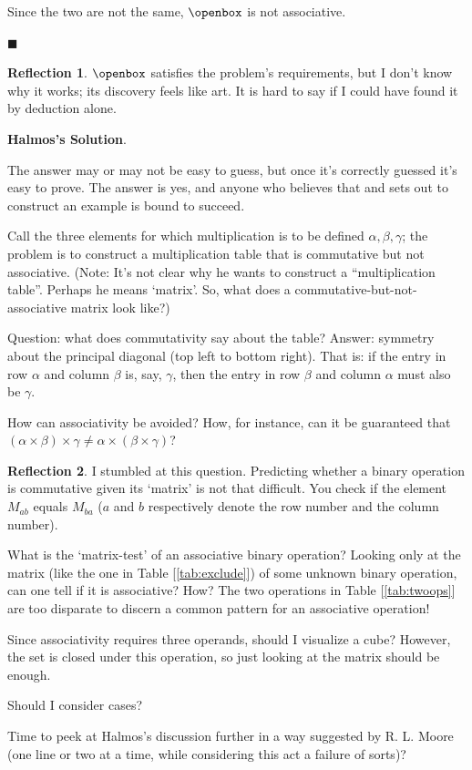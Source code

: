\documentclass[english,notitlepage,smartquotes]{hgbreport}
\theoremstyle{definition}
\theoremstyle{definition}
\theoremstyle{remark}
\theoremstyle{definition}
\theoremstyle{plain}
\renewcommand\qedsymbol{$\blacksquare$}
\theoremstyle{definition}
\newtheorem{reflection}{Reflection}
\begin{document}
Since the two are not the same, $\openbox$ is not associative.

\qedsymbol

\begin{reflection}
$\openbox$ satisfies the problem's requirements, but I don't know why it works; its discovery feels like art. It is hard to say if I could have found it by deduction alone. 
\end{reflection}
\textbf{Halmos's Solution}.

The answer may or may not be easy to guess, but once it's correctly guessed it's easy to prove. The answer is yes, and anyone who believes that and sets out to construct an example is bound to succeed.

Call the three elements for which multiplication is to be defined $\alpha,\beta,\gamma$; the problem is to construct a multiplication table that is commutative but not associative. (Note: It's not clear why he wants to construct a ``multiplication table''. Perhaps he means `matrix'. So, what does a commutative-but-not-associative matrix look like?)

Question: what does commutativity say about the table? Answer: symmetry about the principal diagonal (top left to bottom right). That is: if the entry in row $\alpha$ and column $\beta$ is, say, $\gamma$, then the entry in row $\beta$ and column $\alpha$ must also be $\gamma$.

How can associativity be avoided? How, for instance, can it be guaranteed that $ (\alpha\times\beta)\times\gamma\ne\alpha\times(\beta\times\gamma)$?
\begin{reflection}
I stumbled at this question. Predicting whether a binary operation is commutative given its `matrix' is not that difficult. You check if the element $M_{ab}$ equals $M_{ba}$ ($a$ and $b$ respectively denote the row number and the column number).

What is the `matrix-test' of an associative binary operation? Looking only at the matrix (like the one in Table [\ref{tab:exclude}]) of some unknown binary operation, can one tell if it is associative? How? The two operations in Table [\ref{tab:twoops}] are too disparate to discern a common pattern for an associative operation!

Since associativity requires three operands, should I visualize a cube? However, the set is closed under this operation, so just looking at the matrix should be enough. 

Should I consider cases?

Time to peek at Halmos's discussion further in a way suggested by R. L. Moore \cite{Moore1966} (one line or two at a time, while considering this act a failure of sorts)?
\end{reflection}
\end{document}
